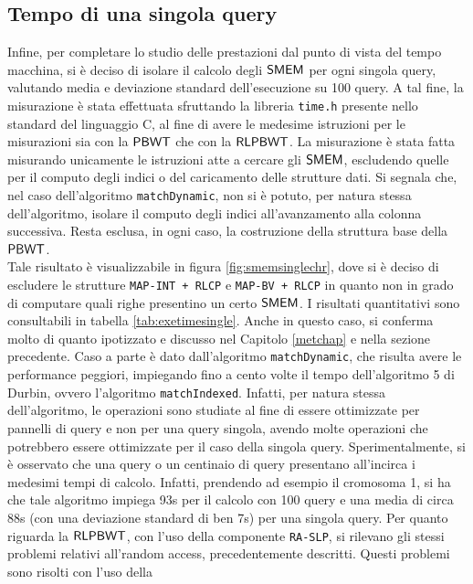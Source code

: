 \subsection{Tempo di una singola query}
Infine, per completare lo studio delle prestazioni dal punto di vista del tempo
macchina, si è deciso di 
isolare il calcolo degli $\mbox{\rm {\sf SMEM}}$ per ogni singola query, valutando media e
deviazione standard dell'esecuzione su 100 query. A tal fine, la misurazione è
stata 
effettuata sfruttando la libreria \texttt{time.h} presente nello standard del
linguaggio C, al fine di avere le medesime istruzioni per le misurazioni sia con
la $\mbox{\rm {\sf PBWT}}$ 
che con la $\mbox{\rm {\sf RLPBWT}}$. La misurazione è stata fatta misurando unicamente le
istruzioni atte a cercare gli $\mbox{\rm {\sf SMEM}}$, 
escludendo quelle per il computo degli indici o del caricamento delle strutture
dati.
Si segnala che, nel caso dell'algoritmo \texttt{matchDynamic}, non si è
potuto, per natura stessa dell'algoritmo, isolare il computo degli indici
all'avanzamento alla colonna successiva. Resta esclusa, in ogni caso, la
costruzione della struttura base della $\mbox{\rm {\sf PBWT}}$.
\\
Tale risultato è visualizzabile in figura
\ref{fig:smemsinglechr}, dove si è deciso di escludere le strutture
\texttt{MAP-INT + RLCP} e \texttt{MAP-BV + RLCP} in quanto non in grado di
computare quali righe presentino un certo $\mbox{\rm {\sf SMEM}}$. I risultati
quantitativi sono consultabili in tabella \ref{tab:exetimesingle}. Anche in
questo caso, 
si conferma molto di quanto ipotizzato e discusso nel Capitolo
\ref{metchap} e nella sezione precedente. Caso a parte
è dato dall'algoritmo \texttt{matchDynamic}, che risulta avere le performance
peggiori, impiegando fino a cento volte il tempo dell'algoritmo 5 di
Durbin, ovvero l'algoritmo \texttt{matchIndexed}. Infatti, per natura stessa
dell'algoritmo,  
le operazioni sono studiate al fine di essere ottimizzate per pannelli di query
e non per una query singola, avendo molte
operazioni che potrebbero essere ottimizzate per il caso della singola
query. Sperimentalmente, si è
osservato che una query o un centinaio di query presentano all'incirca i
medesimi tempi di calcolo. Infatti, prendendo ad esempio il cromosoma 1, si ha
che tale 
algoritmo impiega 93s per il calcolo con 100 query e una media di circa 88s (con
una deviazione standard di ben 7s) per
una singola query. Per quanto riguarda la $\mbox{\rm {\sf RLPBWT}}$, con l'uso della
componente \texttt{RA-SLP}, si rilevano gli stessi problemi relativi all'random
access, precedentemente descritti. Questi problemi sono risolti con l'uso della
